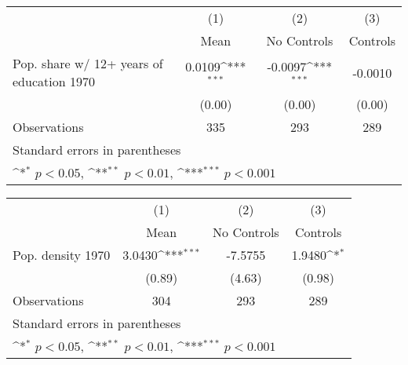 {
\def\sym#1{\ifmmode^{#1}\else\(^{#1}\)\fi}
\begin{tabular}{l*{3}{c}}
\hline\hline
                    &\multicolumn{1}{c}{(1)}&\multicolumn{1}{c}{(2)}&\multicolumn{1}{c}{(3)}\\
                    &\multicolumn{1}{c}{Mean}&\multicolumn{1}{c}{No Controls}&\multicolumn{1}{c}{Controls}\\
\hline
Pop. share w/ 12+ years of education 1970&      0.0109\sym{***}&     -0.0097\sym{***}&     -0.0010         \\
                    &      (0.00)         &      (0.00)         &      (0.00)         \\
\hline
Observations        &         335         &         293         &         289         \\
\hline\hline
\multicolumn{4}{l}{\footnotesize Standard errors in parentheses}\\
\multicolumn{4}{l}{\footnotesize \sym{*} \(p<0.05\), \sym{**} \(p<0.01\), \sym{***} \(p<0.001\)}\\
\end{tabular}
}
{
\def\sym#1{\ifmmode^{#1}\else\(^{#1}\)\fi}
\begin{tabular}{l*{3}{c}}
\hline\hline
                    &\multicolumn{1}{c}{(1)}&\multicolumn{1}{c}{(2)}&\multicolumn{1}{c}{(3)}\\
                    &\multicolumn{1}{c}{Mean}&\multicolumn{1}{c}{No Controls}&\multicolumn{1}{c}{Controls}\\
\hline
Pop. density 1970   &      3.0430\sym{***}&     -7.5755         &      1.9480\sym{*}  \\
                    &      (0.89)         &      (4.63)         &      (0.98)         \\
\hline
Observations        &         304         &         293         &         289         \\
\hline\hline
\multicolumn{4}{l}{\footnotesize Standard errors in parentheses}\\
\multicolumn{4}{l}{\footnotesize \sym{*} \(p<0.05\), \sym{**} \(p<0.01\), \sym{***} \(p<0.001\)}\\
\end{tabular}
}
